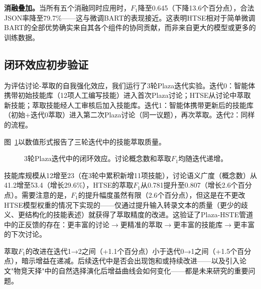 \documentclass[conference]{IEEEtran}
\begin{document}
\textbf{消融叠加。}当所有五个消融同时应用时，$F_1$降至0.645（下降13.6个百分点），合法JSON率降至79.7\%——这与微调BART的表现接近。这表明HTSE相对于简单微调BART的全部优势确实来自其各个组件的协同贡献，而非来自更大的模型或更多的训练数据。

\subsection{闭环效应初步验证}

为评估讨论-萃取的自我强化效应，我们运行了3轮Plaza迭代实验。迭代0：智能体携带初始技能库（12项人工编写技能）进入首次Plaza讨论；HTSE从讨论中萃取新技能；萃取技能经人工审核后加入技能库。迭代1：智能体携带更新后的技能库（初始+迭代0萃取）进入第二次Plaza讨论（同一议题），再次萃取。迭代2：同样的流程。

图~\ref{fig:iter_quality}以数值形式报告了三轮迭代中的技能萃取质量。

\begin{figure}[t]
\centering
{}
\caption{3轮Plaza迭代中的闭环效应。讨论概念数和萃取$F_1$均随迭代递增。}
\label{fig:iter_quality}
\end{figure}

技能库规模从12增至23（在3轮中累积新增11项技能），讨论语义广度（概念数）从41.2增至53.4（增长29.6\%），HTSE的萃取$F_1$从0.781提升至0.807（增长2.6个百分点）。需要注意的是，$F_1$的提升幅度虽然有限（2.6个百分点），但这是在不更改HTSE模型权重的情况下实现的——仅通过提升输入转录文本的质量（更少的歧义、更结构化的技能表述）就获得了萃取精度的改进。这验证了Plaza-HSTE管道中的正反馈的存在：更丰富的讨论$\to$更精准的萃取$\to$更丰富的技能库$\to$更丰富的下次讨论。

萃取$F_1$的改进在迭代1→2之间（+1.1个百分点）小于迭代0→1之间（+1.5个百分点），暗示增益在递减。后续迭代中是否会出现饱和或持续改进——以及引入论文"物竞天择"中的自然选择演化后增益曲线会如何变化——都是未来研究的重要问题。
\end{document}
